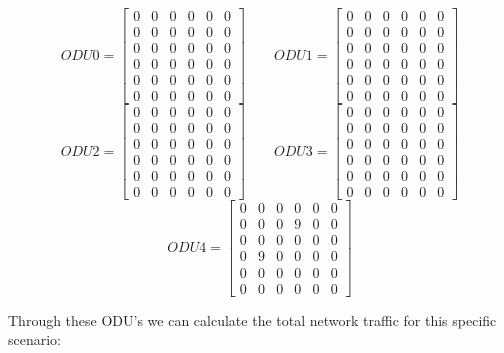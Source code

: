\[
ODU0=
\begin{bmatrix}
0 & 0 & 0 & 0 & 0 & 0 \\
0 & 0 & 0 & 0 & 0 & 0 \\
0 & 0 & 0 & 0 & 0 & 0 \\
0 & 0 & 0 & 0 & 0 & 0 \\
0 & 0 & 0 & 0 & 0 & 0 \\
0 & 0 & 0 & 0 & 0 & 0
\end{bmatrix}
\qquad ODU1=
\begin{bmatrix}
0 & 0 & 0 & 0 & 0 & 0 \\
0 & 0 & 0 & 0 & 0 & 0 \\
0 & 0 & 0 & 0 & 0 & 0 \\
0 & 0 & 0 & 0 & 0 & 0 \\
0 & 0 & 0 & 0 & 0 & 0 \\
0 & 0 & 0 & 0 & 0 & 0
\end{bmatrix}
\]
\[
ODU2=
\begin{bmatrix}
0 & 0 & 0 & 0 & 0 & 0 \\
0 & 0 & 0 & 0 & 0 & 0 \\
0 & 0 & 0 & 0 & 0 & 0 \\
0 & 0 & 0 & 0 & 0 & 0 \\
0 & 0 & 0 & 0 & 0 & 0 \\
0 & 0 & 0 & 0 & 0 & 0
\end{bmatrix}
\qquad ODU3=
\begin{bmatrix}
0 & 0 & 0 & 0 & 0 & 0 \\
0 & 0 & 0 & 0 & 0 & 0 \\
0 & 0 & 0 & 0 & 0 & 0 \\
0 & 0 & 0 & 0 & 0 & 0 \\
0 & 0 & 0 & 0 & 0 & 0 \\
0 & 0 & 0 & 0 & 0 & 0
\end{bmatrix}
\]
\[
ODU4=
\begin{bmatrix}
0 & 0 & 0 & 0 & 0 & 0 \\
0 & 0 & 0 & 9 & 0 & 0 \\
0 & 0 & 0 & 0 & 0 & 0 \\
0 & 9 & 0 & 0 & 0 & 0 \\
0 & 0 & 0 & 0 & 0 & 0 \\
0 & 0 & 0 & 0 & 0 & 0
\end{bmatrix}
\]

\vspace{17pt}
Through these ODU's we can calculate the total network traffic for this specific scenario:\\

